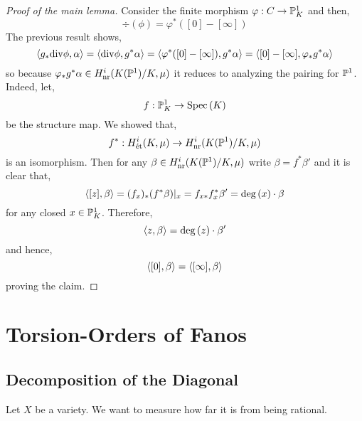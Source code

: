 \documentclass[12pt]{article}
\begin{document}
\begin{proof}[Proof of the main lemma]
Consider the finite morphism $\varphi : C \to \P^1_K$ and then,
\[ \div(\phi) = \varphi^*([0] - [\infty]) \]
The previous result shows,
\[ \inner{g_* \div{\phi}}{\alpha} = \inner{\div{\phi}}{g^* \alpha} = \inner{\varphi^*([0] - [\infty])}{g^* \alpha} 
= \inner{[0] - [\infty]}{\varphi_* g^* \alpha} \]
so because $\varphi_* g^* \alpha \in H^i_{\nr}(K(\P^1)/K, \mu)$ it reduces to analyzing the pairing for $\P^1$. Indeed, let,
\[ f : \P^1_K \to \Spec{K} \]
be the structure map. We showed that, 
\[ f^* : H_{\et}^i(K, \mu) \to H^i_{\nr}(K(\P^1)/K, \mu) \] 
is an isomorphism. Then for any $\beta \in H^i_{\nr}(K(\P^1) / K, \mu)$ write $\beta = f^* \beta'$ and it is clear that,
\[ \inner{[z]}{\beta} = (f_x)_* (f^* \beta)|_x = f_{x*} f^*_x \beta'  = \deg{(x)} \cdot \beta \]
for any closed $x \in \P^1_K$. Therefore,
\[ \inner{z}{\beta} = \deg{(z)} \cdot \beta' \]
and hence,
\[ \inner{[0]}{\beta} = \inner{[\infty]}{\beta} \]
proving the claim.
\end{proof}



\section{Torsion-Orders of Fanos}

\subsection{Decomposition of the Diagonal}

Let $X$ be a variety. We want to measure how far it is from being rational. 
\end{document}
